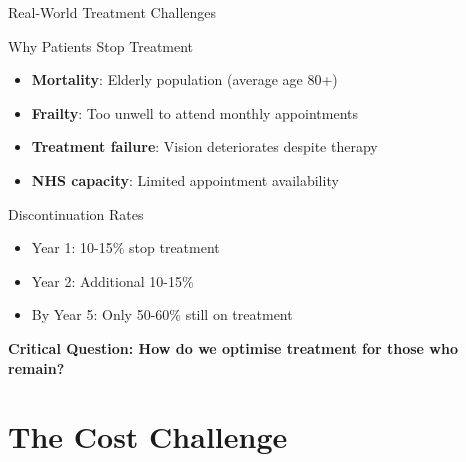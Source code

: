 \documentclass[10pt,aspectratio=169]{beamer}
\begin{document}
\begin{frame}{Real-World Treatment Challenges}
\begin{alertblock}{Why Patients Stop Treatment}
\begin{itemize}
    \item \textbf{Mortality}: Elderly population (average age 80+)
    \item \textbf{Frailty}: Too unwell to attend monthly appointments
    \item \textbf{Treatment failure}: Vision deteriorates despite therapy
    \item \textbf{NHS capacity}: Limited appointment availability
\end{itemize}
\end{alertblock}

\begin{block}{Discontinuation Rates}
\begin{itemize}
    \item Year 1: 10-15\% stop treatment
    \item Year 2: Additional 10-15\%
    \item By Year 5: Only 50-60\% still on treatment
\end{itemize}
\end{block}

\centering
\textbf{Critical Question: How do we optimise treatment for those who remain?}
\end{frame}

\section{The Cost Challenge}
\end{document}
